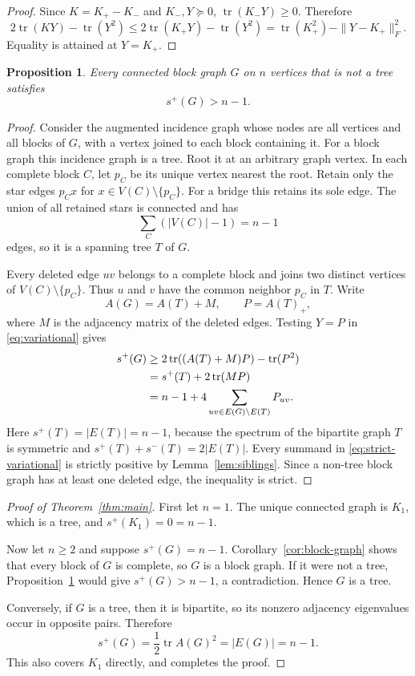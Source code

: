 \documentclass[11pt]{article}
\newtheorem{proposition}[theorem]{Proposition}
\theoremstyle{remark}
\newcommand{\tr}{\operatorname{tr}}
\begin{document}
\begin{proof}
Since $K=K_+-K_-$ and $K_-,Y\succeq0$,
$\tr(K_-Y)\geq0$.  Therefore
\[
 2\tr(KY)-\tr(Y^2)
 \leq2\tr(K_+Y)-\tr(Y^2)
 =\tr(K_+^2)-\|Y-K_+\|_F^2.
\]
Equality is attained at $Y=K_+$.
\end{proof}

\begin{proposition}\label{prop:block-strict}
Every connected block graph $G$ on $n$ vertices that is not a tree satisfies
\[
 s^+(G)>n-1.
\]
\end{proposition}

\begin{proof}
Consider the augmented incidence graph whose nodes are all vertices and all
blocks of $G$, with a vertex joined to each block containing it.  For a block
graph this incidence graph is a tree.  Root it at an arbitrary graph vertex.
In each complete block $C$, let $p_C$ be its unique vertex nearest the root.
Retain only the star edges $p_Cx$ for
$x\in V(C)\setminus\{p_C\}$.  For a bridge this retains its sole edge.  The
union of all retained stars is connected and has
\[
 \sum_C(|V(C)|-1)=n-1
\]
edges, so it is a spanning tree $T$ of $G$.

Every deleted edge $uv$ belongs to a complete block and joins two distinct
vertices of $V(C)\setminus\{p_C\}$.  Thus $u$ and $v$ have the common
neighbor $p_C$ in $T$.  Write
\[
 A(G)=A(T)+M,
 \qquad P=A(T)_+,
\]
where $M$ is the adjacency matrix of the deleted edges.  Testing $Y=P$ in
\eqref{eq:variational} gives
\begin{align}
 s^+(G)
 &\geq2\tr((A(T)+M)P)-\tr(P^2)\notag\\
 &=s^+(T)+2\tr(MP)\notag\\
 &=n-1+4\sum_{uv\in E(G)\setminus E(T)}P_{uv}.
 \label{eq:strict-variational}
\end{align}
Here $s^+(T)=|E(T)|=n-1$, because the spectrum of the bipartite graph $T$
is symmetric and $s^+(T)+s^-(T)=2|E(T)|$.  Every summand in
\eqref{eq:strict-variational} is strictly positive by
Lemma~\ref{lem:siblings}.  Since a non-tree block graph has at least one
deleted edge, the inequality is strict.
\end{proof}

\begin{proof}[Proof of Theorem~\ref{thm:main}]
First let $n=1$.  The unique connected graph is $K_1$, which is a tree, and
$s^+(K_1)=0=n-1$.

Now let $n\geq2$ and suppose $s^+(G)=n-1$.  Corollary~\ref{cor:block-graph}
shows that every block of $G$ is complete, so $G$ is a block graph.  If it
were not a tree, Proposition~\ref{prop:block-strict} would give
$s^+(G)>n-1$, a contradiction.  Hence $G$ is a tree.

Conversely, if $G$ is a tree, then it is bipartite, so its nonzero adjacency
eigenvalues occur in opposite pairs.  Therefore
\[
 s^+(G)=\frac12\tr A(G)^2=|E(G)|=n-1.
\]
This also covers $K_1$ directly, and completes the proof.
\end{proof}
\end{document}
